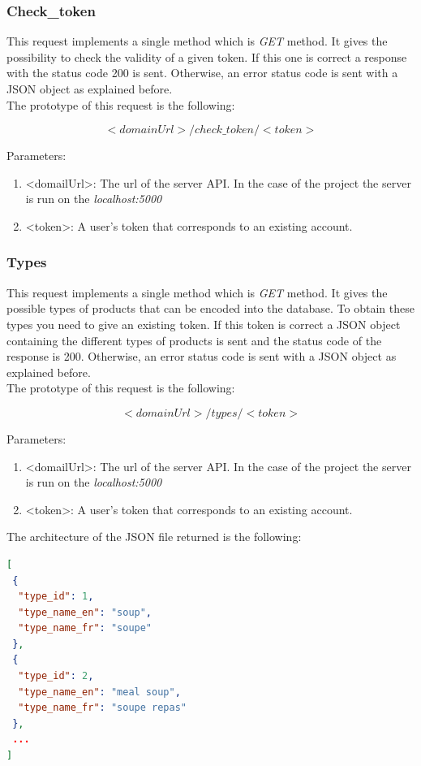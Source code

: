 \subsubsection{Check\_token}
This request implements a single method which is \textit{GET} method. It gives the possibility to check the validity of a given token. If this one is correct a response with the status code 200 is sent. Otherwise, an error status code is sent with a JSON object as explained before.\\

The prototype of this request is the following:

$$<domainUrl>/check\_token/<token>$$

Parameters:
\begin{enumerate}
\item <domailUrl>: The url of the server API. In the case of the project the server is run on the \textit{localhost:5000}
\item <token>: A user's token that corresponds to an existing account.
\end{enumerate}

\subsubsection{Types}
This request implements a single method which is \textit{GET} method. It gives the possible types of products that can be encoded into the database. To obtain these types you need to give an existing token. If this token is correct a JSON object containing the different types of products is sent and the status code of the response is 200. Otherwise, an error status code is sent with a JSON object as explained before.\\

The prototype of this request is the following:

$$<domainUrl>/types/<token>$$

Parameters:
\begin{enumerate}
\item <domailUrl>: The url of the server API. In the case of the project the server is run on the \textit{localhost:5000}
\item <token>: A user's token that corresponds to an existing account.
\end{enumerate}

The architecture of the JSON file returned is the following:
\begin{lstlisting}[language=json]
[
 {
  "type_id": 1,
  "type_name_en": "soup",
  "type_name_fr": "soupe"
 },
 {
  "type_id": 2,
  "type_name_en": "meal soup",
  "type_name_fr": "soupe repas"
 },
 ...
]
\end{lstlisting}

